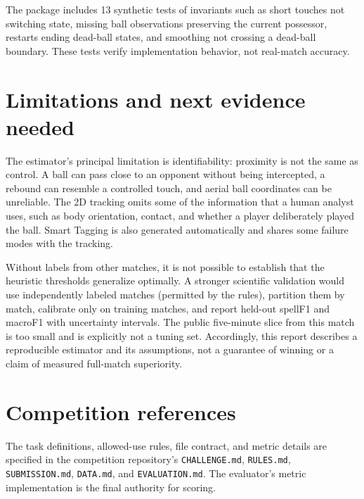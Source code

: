 \documentclass[11pt,a4paper]{article}
\begin{document}
The package includes 13 synthetic tests of invariants such as short touches not switching state,
missing ball observations preserving the current possessor, restarts ending dead-ball states,
and smoothing not crossing a dead-ball boundary. These tests verify implementation behavior, not
real-match accuracy.

\section{Limitations and next evidence needed}

The estimator's principal limitation is identifiability: proximity is not the same as control. A
ball can pass close to an opponent without being intercepted, a rebound can resemble a controlled
touch, and aerial ball coordinates can be unreliable. The 2D tracking omits some of the information
that a human analyst uses, such as body orientation, contact, and whether a player deliberately
played the ball. Smart Tagging is also generated automatically and shares some failure modes with
the tracking.

Without labels from other matches, it is not possible to establish that the heuristic thresholds
generalize optimally. A stronger scientific validation would use independently labeled matches
(permitted by the rules), partition them by match, calibrate only on training matches, and report
held-out spellF1 and macroF1 with uncertainty intervals. The public five-minute slice from this
match is too small and is explicitly not a tuning set. Accordingly, this report describes a
reproducible estimator and its assumptions, not a guarantee of winning or a claim of measured
full-match superiority.

\section*{Competition references}
The task definitions, allowed-use rules, file contract, and metric details are specified in the
competition repository's \texttt{CHALLENGE.md}, \texttt{RULES.md}, \texttt{SUBMISSION.md},
\texttt{DATA.md}, and \texttt{EVALUATION.md}. The evaluator's metric implementation is the final
authority for scoring.
\end{document}
